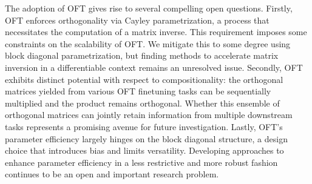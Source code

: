 The adoption of OFT gives rise to several compelling open questions. Firstly, OFT enforces orthogonality via Cayley parametrization, a process that necessitates the computation of a matrix inverse. This requirement imposes some constraints on the scalability of OFT. We mitigate this to some degree using block diagonal parametrization, but finding methods to accelerate matrix inversion in a differentiable context remains an unresolved issue. Secondly, OFT exhibits distinct potential with respect to compositionality: the orthogonal matrices yielded from various OFT finetuning tasks can be sequentially multiplied and the product remains orthogonal. Whether this ensemble of orthogonal matrices can jointly retain information from multiple downstream tasks represents a promising avenue for future investigation. Lastly, OFT's parameter efficiency largely hinges on the block diagonal structure, a design choice that introduces bias and limits versatility. Developing approaches to enhance parameter efficiency in a less restrictive and more robust fashion continues to be an open and important research problem.

